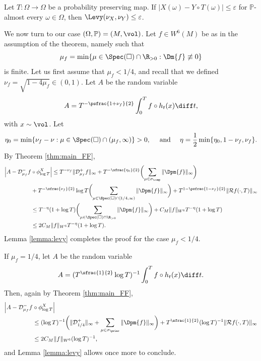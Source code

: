 \begin{lemma}\label{lemma:levy}
Let $T \colon \Omega \to \Omega$ be a probability preserving map. If $|X(\omega) - Y\circ T(\omega)|\leq \varepsilon$ for $\mathbb{P}$-almost every $\omega \in \Omega$, then $\Levy(\nu_X, \nu_Y) \leq \varepsilon$.
\end{lemma}

We now turn to our case $(\Omega, \mathbb{P}) = (M, \vol)$.
Let $f \in W^6(M)$ be as in the assumption of the theorem, namely such that
\[
\mu_f = \min \{ \mu \in \Spec(\square) \cap \R_{>0} : \Dm{f} \not\equiv 0 \}
\]
is finite.
Let us first assume that $\mu_f <1/4$, and recall that we defined $\nu_f = \sqrt{1-4\mu_f} \in (0,1)$. Let $A$ be the random variable
\[
A = T^{-\psfrac{1+\nu_f}{2}} \int_0^T f \circ h_t(x) \diff t,
\]
with $x \sim \vol$.
Let
\[
\eta_0 = \min\{ \nu_f - \nu : \mu \in \Spec(\square) \cap (\mu_f, \infty) \} >0, \quad \text{ and } \quad \eta= \frac{1}{2} \min\{\eta_0, 1-\nu_f, \nu_f\}.
\]
By Theorem \ref{thm:main_FF},
\begin{align*}
\Bigl\lvert A - \mathcal{D}^{-}_{\mu_f} f&\circ \phi^X_{\log T} \Bigr\rvert \leq T^{- \nu_f} \|\mathcal{D}^{+}_{\mu_f} f\|_{\infty} + T^{- \sfrac{\eta_0}{2}} \biggl(\sum_{\mu \in \sigma_{\comp}} \|\Dpm{f} \|_{\infty} \biggr) \\
& + T^{- \sfrac{\nu_f}{2}} \log T \biggl(\sum_{\mu \in \Spec(\square) \cap [1/4, \infty)} \|\Dpm{f} \|_{\infty} \biggr) + T^{1-\psfrac{1-\nu_f}{2}} \|\mathcal{R}f(\cdot, T) \|_{\infty} \\
&\leq T^{-\eta} (1+\log T) \biggl(\sum_{\mu \in \Spec(\square) \cap \R_{>0}} \|\Dpm{f} \|_{\infty} \biggr) + C_M \|f\|_{W^6} T^{-\eta}(1+\log T)\\
&\leq 2C_M \|f\|_{W^6} T^{-\eta}(1+\log T).
\end{align*}
Lemma \ref{lemma:levy} completes the proof for the case $\mu_f < 1/4$.

If $\mu_f = 1/4$, let $A$ be the random variable
\[
A = (T^{\sfrac{1}{2}} \log T)^{-1} \int_0^T f \circ h_t(x) \diff t.
\]
Then, again by Theorem \ref{thm:main_FF},
\begin{align*}
\Bigl\lvert A - \mathcal{D}^{-}_{\mu_f} f &\circ \phi^X_{\log T} \Bigr\rvert\\
&\leq (\log T)^{-1} \biggl(\|\mathcal{D}^{+}_{1/4} \|_{\infty} + \sum_{\mu \in \sigma_{\princ}} \|\Dpm{f} \|_{\infty} \biggr) + T^{\sfrac{1}{2}} (\log T)^{-1} \|\mathcal{R}f(\cdot, T) \|_{\infty} \\
& \leq 2C_M \|f\|_{W^6} (\log T)^{-1},
\end{align*}
and Lemma \ref{lemma:levy} allows once more to conclude.

